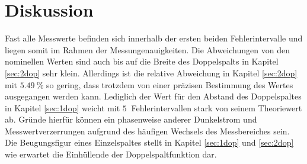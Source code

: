 \section{Diskussion}

Fast alle Messwerte befinden sich innerhalb der ersten beiden Fehlerintervalle und liegen somit im Rahmen der Messungenauigkeiten. Die Abweichungen von
den nominellen Werten sind auch bis auf die Breite des Doppelspalts in Kapitel \ref{sec:2dop} sehr klein. Allerdings ist die relative Abweichung
in Kapitel \ref{sec:2dop} mit $\SI{5,49}{\%}$ so gering, dass trotzdem von einer präzisen Bestimmung des Wertes ausgegangen werden kann.
Lediglich der Wert für den Abstand des Doppelspaltes in Kapitel \ref{sec:1dop} weicht mit $\SI{5}{}$ Fehlerintervallen stark
von seinem Theoriewert ab. Gründe hierfür können ein phasenweise anderer Dunkelstrom und Messwertverzerrungen aufgrund des häufigen
Wechsels des Messbereiches sein.
Die Beugungsfigur eines Einzelspaltes stellt in Kapitel \ref{sec:1dop} und \ref{sec:2dop} wie erwartet die Einhüllende der Doppelspaltfunktion dar.
